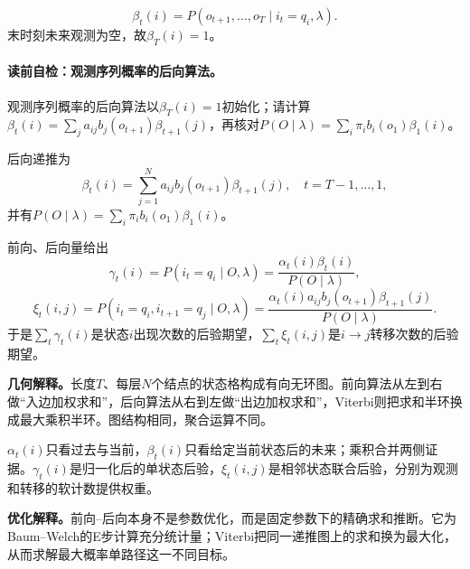 \begin{definition}[后向概率]\label{def:V3-C05-backward}
\[
\beta_t(i)=P(o_{t+1},\ldots,o_T\mid i_t=q_i,\lambda).
\]
末时刻未来观测为空，故$\beta_T(i)=1$。
\end{definition}

\paragraph{读前自检：观测序列概率的后向算法。}观测序列概率的后向算法以$\beta_T(i)=1$初始化；请计算$\beta_t(i)=\sum_j a_{ij}b_j(o_{t+1})\beta_{t+1}(j)$，再核对$P(O\mid\lambda)=\sum_i\pi_i b_i(o_1)\beta_1(i)$。\par

后向递推为
\[
\beta_t(i)=\sum_{j=1}^{N}a_{ij}b_j(o_{t+1})\beta_{t+1}(j),
\quad t=T-1,\ldots,1,
\]
并有$P(O\mid\lambda)=\sum_i\pi_i b_i(o_1)\beta_1(i)$。

前向、后向量给出
\[
\gamma_t(i)=P(i_t=q_i\mid O,\lambda)
=\frac{\alpha_t(i)\beta_t(i)}{P(O\mid\lambda)},
\]
\[
\xi_t(i,j)=P(i_t=q_i,i_{t+1}=q_j\mid O,\lambda)
=\frac{\alpha_t(i)a_{ij}b_j(o_{t+1})\beta_{t+1}(j)}{P(O\mid\lambda)}.
\]
于是$\sum_t\gamma_t(i)$是状态$i$出现次数的后验期望，$\sum_t\xi_t(i,j)$是$i\to j$转移次数的后验期望。

\label{struct:V3-C05-CH14}
\begin{geometrybox}
\textbf{几何解释。}长度$T$、每层$N$个结点的状态格构成有向无环图。前向算法从左到右做“入边加权求和”，后向算法从右到左做“出边加权求和”，Viterbi则把求和半环换成最大乘积半环。图结构相同，聚合运算不同。
\end{geometrybox}

\label{struct:V3-C05-CH15}
\begin{probabilitybox}
$\alpha_t(i)$只看过去与当前，$\beta_t(i)$只看给定当前状态后的未来；乘积合并两侧证据。$\gamma_t(i)$是归一化后的单状态后验，$\xi_t(i,j)$是相邻状态联合后验，分别为观测和转移的软计数提供权重。
\end{probabilitybox}

\label{struct:V3-C05-CH16}
\begin{optimizationbox}
\textbf{优化解释。}前向--后向本身不是参数优化，而是固定参数下的精确求和推断。它为Baum--Welch的E步计算充分统计量；Viterbi把同一递推图上的求和换为最大化，从而求解最大概率单路径这一不同目标。
\end{optimizationbox}


